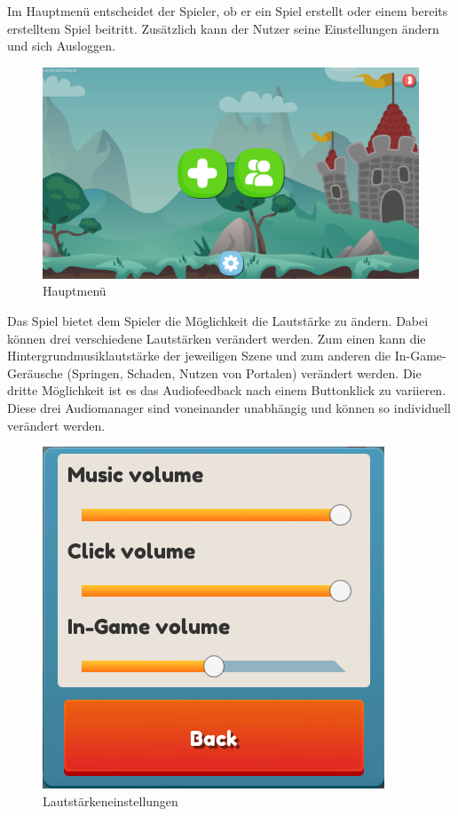 Im Hauptmenü entscheidet der Spieler, ob er ein Spiel erstellt oder einem bereits erstelltem Spiel beitritt. Zusätzlich kann der Nutzer seine Einstellungen ändern und sich Ausloggen.

\begin{figure}[H]
    \begin{center}
      \includegraphics[width=\linewidth]{img/realisierung/menu}
      \caption{Hauptmenü}
      \label{fig:realisierung:realisierung:hauptmenu}
    \end{center}
\end{figure}

Das Spiel bietet dem Spieler die Möglichkeit die Lautstärke zu ändern. Dabei können drei verschiedene Lautstärken verändert werden. Zum einen kann die Hintergrundmusiklautstärke der jeweiligen Szene und zum anderen die In-Game-Geräusche (Springen, Schaden, Nutzen von Portalen) verändert werden. Die dritte Möglichkeit ist es das Audiofeedback nach einem Buttonklick zu variieren. Diese drei Audiomanager sind voneinander unabhängig und können so individuell verändert werden.

\begin{figure}[H]
    \begin{center}
      \includegraphics[width=.33\linewidth]{img/realisierung/settings}
      \caption{Lautstärkeneinstellungen}
      \label{fig:realisierung:realisierung:settings}
    \end{center}
\end{figure}

